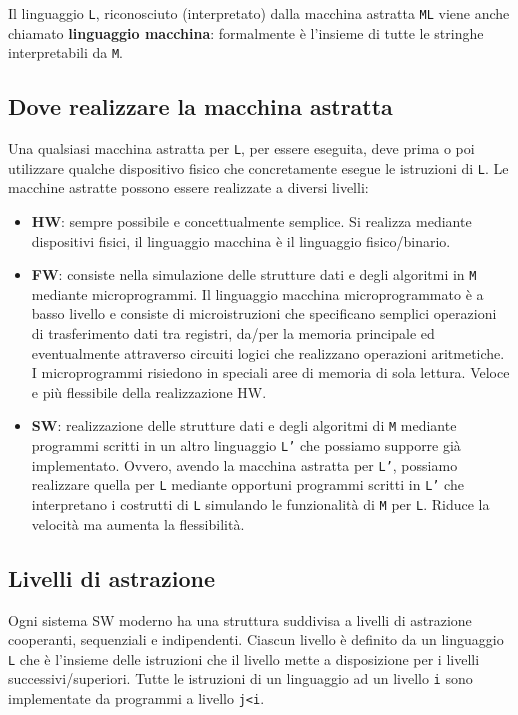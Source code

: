 \documentclass[12pt,a4paper]{article}
\begin{document}
Il linguaggio \texttt{L}, riconosciuto (interpretato) dalla macchina astratta \texttt{ML} viene anche chiamato \textbf{linguaggio macchina}: formalmente è l'insieme di tutte le stringhe interpretabili da \texttt{M}.

\subsection{Dove realizzare la macchina astratta}
Una qualsiasi macchina astratta per \texttt{L}, per essere eseguita, deve prima o poi utilizzare qualche dispositivo fisico che concretamente esegue le istruzioni di \texttt{L}.
Le macchine astratte possono essere realizzate a diversi livelli:
\begin{itemize}
\item \textbf{HW}: sempre possibile e concettualmente semplice. Si realizza mediante dispositivi fisici, il linguaggio macchina è il linguaggio fisico\slash binario.
\item \textbf{FW}: consiste nella simulazione delle strutture dati e degli algoritmi in \texttt{M} mediante microprogrammi. Il linguaggio macchina microprogrammato è a basso livello e consiste di microistruzioni che specificano semplici operazioni di trasferimento dati tra registri, da\slash per la memoria principale ed eventualmente attraverso circuiti logici che realizzano operazioni aritmetiche. I microprogrammi risiedono in speciali aree di memoria di sola lettura. Veloce e più flessibile della realizzazione HW.
\item \textbf{SW}: realizzazione delle strutture dati e degli algoritmi di \texttt{M} mediante programmi scritti in un altro linguaggio \texttt{L'} che possiamo supporre già implementato. Ovvero, avendo la macchina astratta per \texttt{L'}, possiamo realizzare quella per \texttt{L} mediante opportuni programmi scritti in \texttt{L'} che interpretano i costrutti di \texttt{L} simulando le funzionalità di \texttt{M} per \texttt{L}. Riduce la velocità ma aumenta la flessibilità.
\end{itemize}

\subsection{Livelli di astrazione}
Ogni sistema SW moderno ha una struttura suddivisa a livelli di astrazione cooperanti, sequenziali e indipendenti. Ciascun livello è definito da un linguaggio \texttt{L} che è l'insieme delle istruzioni che il livello mette a disposizione per i livelli successivi\slash superiori. Tutte le istruzioni di un linguaggio ad un livello \texttt{i} sono implementate da programmi a livello \texttt{j<i}.
\end{document}

